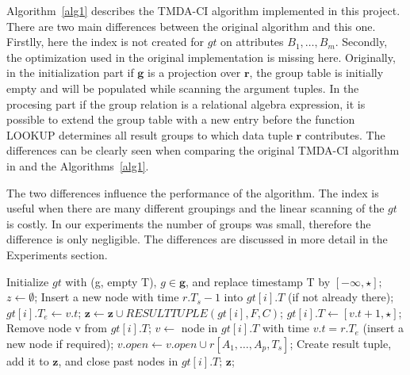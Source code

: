 \documentclass[a4paper,11pt]{article}
\renewcommand{\vec}[1]{\mathbf{#1}}
\begin{document}
Algorithm~\ref{alg1} describes the TMDA-CI algorithm implemented in this project. There are two main differences between the original algorithm and this one. Firstlly, here the index is not created for $gt$ on attributes $B_1,\dots,B_m$. Secondly, the optimization used in the original implementation is missing here. Originally, in the initialization part if $\vec{g}$ is a projection over $\vec{r}$, the group table is initially empty and will be populated while scanning the argument tuples. In the procesing part if the group relation is a relational algebra expression, it is possible to extend the group table with a new entry before the function LOOKUP determines all result groups to which data tuple $\vec{r}$ contributes. The differences can be clearly seen when comparing the original TMDA-CI algorithm in \cite{bohlen} and the Algorithms~\ref{alg1}.

The two differences influence the performance of the algorithm. The index is useful when there are many different groupings and the linear scanning of the $gt$ is costly. In our experiments the number of groups was small, therefore the difference is only negligible. The differences are discussed in more detail in the Experiments section.

\begin{algorithm}
\caption{$\operatorname{TMDA-CI}(\vec{g}, \vec{r}, \vec{F}, \theta, C)$}
\label{alg1}
\begin{algorithmic}
\STATE Initialize $gt$ with (g, empty T), $g \in \vec{g}$, and replace timestamp T by $[- \infty, \star];$
\STATE $z \leftarrow \emptyset$;
\FORALL{tuple $r \in \vec{r}$ in chronological order} 
\STATE Insert a new node with time $r.T_s-1$ into $gt[i].T$ (if not already there);
\STATE $gt[i].T_e \leftarrow v.t$; 
\STATE $\vec{z} \leftarrow \vec{z} \cup RESULTTUPLE(gt[i], F, C)$; 
\STATE $gt[i].T \leftarrow [v.t+1,\star]$; 
\STATE Remove node v from $gt[i].T$;
\ENDFOR 
\ENDIF
\STATE $v \leftarrow$ node in $gt[i].T$ with time $v.t = r.T_e$ (insert a new node if required); 
\STATE $v.open \leftarrow v.open \cup r[A_1, \dots , A_p, T_s]$;
\ENDFOR
\ENDFOR
{}
\STATE Create result tuple, add it to $\vec{z}$, and close past nodes in $gt[i].T$;
\ENDFOR
\ENDFOR
\RETURN $\vec{z}$;
\end{algorithmic}
\end{algorithm}
  
\end{document}
